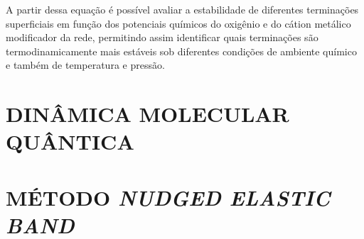 A partir dessa equação é possível avaliar a estabilidade de diferentes terminações superficiais em função dos potenciais químicos do oxigênio e do cátion metálico modificador da rede, permitindo assim identificar quais terminações são termodinamicamente mais estáveis sob diferentes condições de ambiente químico e também de temperatura e pressão.

\section{DINÂMICA MOLECULAR QUÂNTICA}




\section{MÉTODO \textit{NUDGED ELASTIC BAND}}

